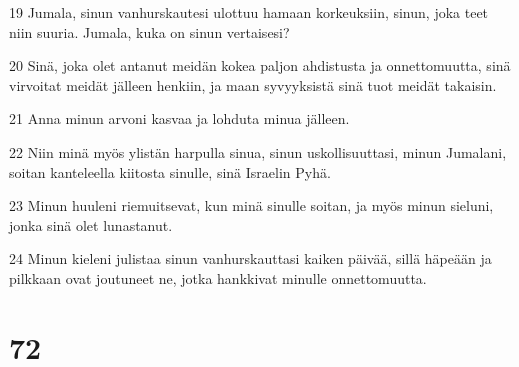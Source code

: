 \par 19 Jumala, sinun vanhurskautesi ulottuu hamaan korkeuksiin, sinun, joka teet niin suuria. Jumala, kuka on sinun vertaisesi?
\par 20 Sinä, joka olet antanut meidän kokea paljon ahdistusta ja onnettomuutta, sinä virvoitat meidät jälleen henkiin, ja maan syvyyksistä sinä tuot meidät takaisin.
\par 21 Anna minun arvoni kasvaa ja lohduta minua jälleen.
\par 22 Niin minä myös ylistän harpulla sinua, sinun uskollisuuttasi, minun Jumalani, soitan kanteleella kiitosta sinulle, sinä Israelin Pyhä.
\par 23 Minun huuleni riemuitsevat, kun minä sinulle soitan, ja myös minun sieluni, jonka sinä olet lunastanut.
\par 24 Minun kieleni julistaa sinun vanhurskauttasi kaiken päivää, sillä häpeään ja pilkkaan ovat joutuneet ne, jotka hankkivat minulle onnettomuutta.

\chapter{72}

